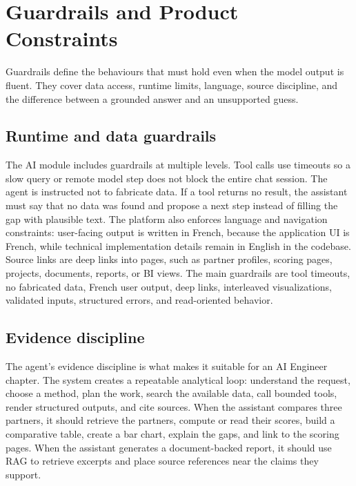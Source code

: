 \section{Guardrails and Product Constraints}
Guardrails define the behaviours that must hold even when the model output is fluent. They cover data access, runtime limits, language, source discipline, and the difference between a grounded answer and an unsupported guess.
\subsection{Runtime and data guardrails}
The AI module includes guardrails at multiple levels. Tool calls use timeouts so a slow query or remote model step does not block the entire chat session. The agent is instructed not to fabricate data. If a tool returns no result, the assistant must say that no data was found and propose a next step instead of filling the gap with plausible text. The platform also enforces language and navigation constraints: user-facing output is written in French, because the application UI is French, while technical implementation details remain in English in the codebase. Source links are deep links into \projectname{} pages, such as partner profiles, scoring pages, projects, documents, reports, or BI views. The main guardrails are tool timeouts, no fabricated data, French user output, deep links, interleaved visualizations, validated inputs, structured errors, and read-oriented behavior.
\subsection{Evidence discipline}
The agent's evidence discipline is what makes it suitable for an AI Engineer chapter. The system creates a repeatable analytical loop: understand the request, choose a method, plan the work, search the available data, call bounded tools, render structured outputs, and cite sources. When the assistant compares three partners, it should retrieve the partners, compute or read their scores, build a comparative table, create a bar chart, explain the gaps, and link to the scoring pages. When the assistant generates a document-backed report, it should use RAG to retrieve excerpts and place source references near the claims they support.

